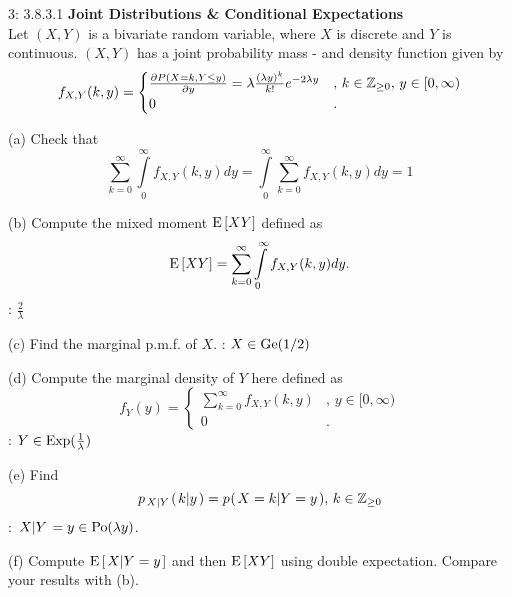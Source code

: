 \documentclass[a4paper,twoside=false,abstract=false,numbers=noenddot,
titlepage=false,headings=small,parskip=half,version=last]{scrartcl}
\begin{document}
\begin{exercise}{3: 3.8.3.1}
    \textbf{Joint Distributions \& Conditional Expectations} \\
    Let $(X, Y)$ is a bivariate random variable, where $X$ is discrete and $Y$
    is continuous. $(X, Y)$ has a joint probability mass - and density function
    given by
    \begin{equation*}
        f_{X,Y}(k, y) = \begin{cases}
            \frac{\partial{P(X=k, Y\le y)}}{\partial{y}} =
                \lambda\frac{(\lambda y)^k}{k!}e^{-2\lambda y}
                    &,\, k\in\mathbb{Z}_{\ge 0},\, y\in [0, \infty) \\
            0       &.
        \end{cases}
    \end{equation*}

    (a) Check that
    \begin{equation*}
        \sum\limits_{k=0}^\infty \int\limits_0^\infty f_{X,Y}(k,y)dy =
            \int\limits_0^\infty \sum\limits_{k=0}^\infty f_{X,Y}(k,y)dy = 1
    \end{equation*}

    (b) Compute the mixed moment ${\rm E}\,[XY]$ defined as
    \begin{equation*}
        {\rm E}\,[XY] =
            \sum\limits_{k=0}^\infty \int\limits_0^\infty f_{X,Y}(k,y)dy.
    \end{equation*}
    \Answer: $\frac{2}{\lambda}$

    (c) Find the marginal p.m.f. of $X$.
    \Answer: $X\in\text{Ge}(1/2)$

    (d) Compute the marginal density of $Y$ here defined as
    \begin{equation*}
        f_Y(y) = \begin{cases}
            \sum\limits_{k=0}^\infty f_{X,Y}(k,y) &, \, y\in[0,\infty) \\
             0                                    &.
        \end{cases}
    \end{equation*}
    \Answer: $Y\in\text{Exp}(\frac{1}{\lambda})$

    (e) Find
    \begin{equation*}
        p_{\left. X \middle\vert Y \right.} (\left. k \middle\vert y \right.) =
            p_{} (\left. X=k \middle\vert Y=y \right.), \, k\in\mathbb{Z}_{\ge 0}
    \end{equation*}
    \Answer: $\left. X \middle\vert Y \right. = y\in\text{Po}(\lambda y)$.

    (f) Compute ${\rm E}\,[\left. X \middle\vert Y=y \right.]$ and then ${\rm E}\,[XY]$ using
    double expectation. Compare your results with (b).
\end{exercise}
\begin{solution}
\end{solution}
\pagebreak
\end{document}
